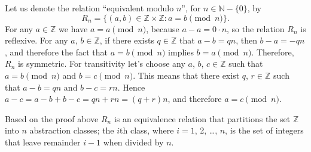 \exercise
Let us denote the relation ``equivalent modulo $n$'', for $n\in\mathbb{N}-\{0\}$, by
\[
    R_n = \{(a,b)\in\mathbb{Z}\times\mathbb{Z}: a=b\!\!\!\pmod{n}\}.
\]
For any $a\in\mathbb{Z}$ we have $a=a\pmod{n}$, because $a-a=0\cdot n$, so the relation $R_n$ is reflexive.
For any $a$, $b\in\mathbb{Z}$, if there exists $q\in\mathbb{Z}$ that $a-b=qn$, then $b-a=-qn$, and therefore the fact that $a=b\pmod{n}$ implies $b=a\pmod{n}$.
Therefore, $R_n$ is symmetric.
For transitivity let's choose any $a$, $b$, $c\in\mathbb{Z}$ such that $a=b\pmod{n}$ and $b=c\pmod{n}$.
This means that there exist $q$, $r\in\mathbb{Z}$ such that $a-b=qn$ and $b-c=rn$.
Hence $a-c=a-b+b-c=qn+rn=(q+r)n$, and therefore $a=c\pmod{n}$.

Based on the proof above $R_n$ is an equivalence relation that partitions the set $\mathbb{Z}$ into $n$ abstraction classes;
the $i$th class, where $i=1$, 2, \dots, $n$, is the set of integers that leave remainder $i-1$ when divided by $n$.
